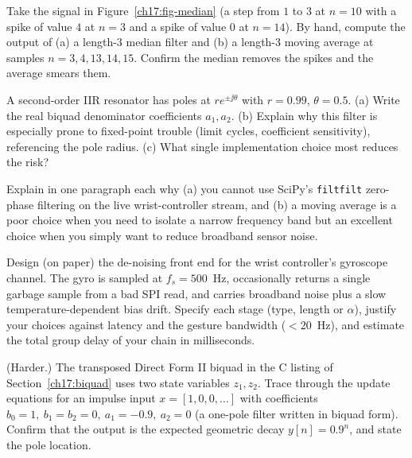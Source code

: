 \begin{exercise}
Take the signal in Figure~\ref{ch17:fig-median} (a step from $1$ to $3$ at
$n=10$ with a spike of value $4$ at $n=3$ and a spike of value $0$ at $n=14$). By
hand, compute the output of (a) a length-$3$ median filter and (b) a length-$3$
moving average at samples $n = 3, 4, 13, 14, 15$. Confirm the median removes the
spikes and the average smears them.
\end{exercise}

\begin{exercise}
A second-order IIR resonator has poles at $r e^{\pm \jj\theta}$ with $r = 0.99$,
$\theta = 0.5$. (a) Write the real biquad denominator coefficients $a_1, a_2$.
(b) Explain why this filter is especially prone to fixed-point trouble (limit
cycles, coefficient sensitivity), referencing the pole radius. (c) What single
implementation choice most reduces the risk?
\end{exercise}

\begin{exercise}
Explain in one paragraph each why (a) you cannot use SciPy's \texttt{filtfilt}
zero-phase filtering on the live wrist-controller stream, and (b) a moving average
is a poor choice when you need to isolate a narrow frequency band but an
excellent choice when you simply want to reduce broadband sensor noise.
\end{exercise}

\begin{exercise}
Design (on paper) the de-noising front end for the wrist controller's gyroscope
channel. The gyro is sampled at $f_s = 500$~Hz, occasionally returns a single
garbage sample from a bad SPI read, and carries broadband noise plus a slow
temperature-dependent bias drift. Specify each stage (type, length or $\alpha$),
justify your choices against latency and the gesture bandwidth ($< 20$~Hz), and
estimate the total group delay of your chain in milliseconds.
\end{exercise}

\begin{exercise}
(Harder.) The transposed Direct Form II biquad in the C listing of
Section~\ref{ch17:biquad} uses two state variables $z_1, z_2$. Trace through the
update equations for an impulse input $x = [1,0,0,\dots]$ with coefficients
$b_0=1,\ b_1=b_2=0,\ a_1=-0.9,\ a_2=0$ (a one-pole filter written in biquad form).
Confirm that the output is the expected geometric decay $y[n] = 0.9^n$, and state
the pole location.
\end{exercise}

